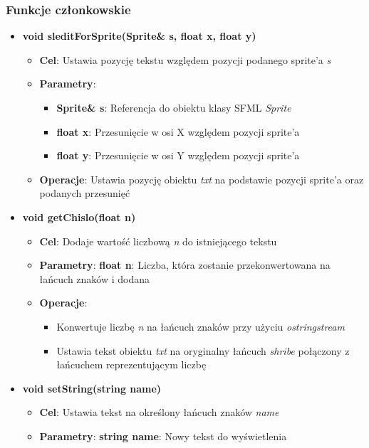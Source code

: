 \documentclass[a4paper, 10pt]{article}
\begin{document}
\subsubsection{Funkcje członkowskie}
\begin{itemize}
	\item \textbf{void sleditForSprite(Sprite\& s, float x, float y)}
		\begin{itemize}
			\item \textbf{Cel}: Ustawia pozycję tekstu względem pozycji podanego sprite'a \emph{s}
			\item \textbf{Parametry}:
				\begin{itemize}
					\item \textbf{Sprite\& s}: Referencja do obiektu klasy SFML \emph{Sprite}
					\item \textbf{float x}: Przesunięcie w osi X względem pozycji sprite'a
					\item \textbf{float y}: Przesunięcie w osi Y względem pozycji sprite'a
				\end{itemize}
			\item \textbf{Operacje}: Ustawia pozycję obiektu \emph{txt} na podstawie pozycji sprite'a oraz podanych przesunięć
		\end{itemize}
	\item \textbf{void getChislo(float n)}
		\begin{itemize}
			\item \textbf{Cel}: Dodaje wartość liczbową \emph{n} do istniejącego tekstu
			\item \textbf{Parametry}: \textbf{float n}: Liczba, która zostanie przekonwertowana na łańcuch znaków i dodana
			\item \textbf{Operacje}:
				\begin{itemize}
					\item Konwertuje liczbę \emph{n} na łańcuch znaków przy użyciu \emph{ostringstream}
					\item Ustawia tekst obiektu \emph{txt} na oryginalny łańcuch \emph{shribe} połączony z łańcuchem reprezentującym liczbę
				\end{itemize}
		\end{itemize}
	\item \textbf{void setString(string name)}
		\begin{itemize}
			\item \textbf{Cel}: Ustawia tekst na określony łańcuch znaków \emph{name}
			\item \textbf{Parametry}: \textbf{string name}: Nowy tekst do wyświetlenia

\end{itemize}
\end{itemize}
\end{document}
